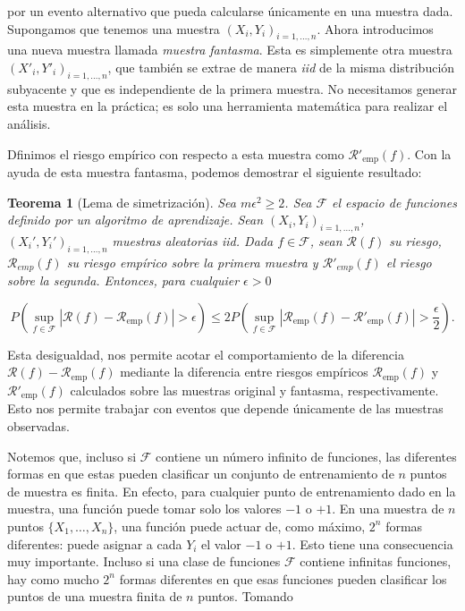\documentclass{article}
\newtheorem{thm}{Teorema}[subsection]
\begin{document}
por un evento alternativo que pueda calcularse únicamente en una muestra dada. Supongamos que tenemos una muestra 
\((X_i, Y_i)_{i=1,\dots,n}\). Ahora introducimos una nueva muestra llamada \textit{muestra fantasma}. 
Esta es simplemente otra muestra \((X'_i, Y'_i)_{i=1,\dots,n}\), que también se extrae de manera 
\textit{iid} de la misma distribución subyacente y que es independiente de la primera muestra. No necesitamos generar 
esta muestra en la práctica; es solo una herramienta matemática para realizar el análisis. \newline

Dfinimos el riesgo empírico con respecto a esta muestra como \(\mathcal{R}'_{\text{emp}}(f)\). 
Con la ayuda de esta muestra fantasma, podemos demostrar el siguiente resultado:\newline

\begin{thm}[Lema de simetrización]

Sea $m\epsilon^2 \geq 2$. Sea $\mathcal{F}$ el espacio de funciones definido por un algoritmo de aprendizaje. Sean
$(X_i,Y_i)_{i=1,\dots, n}$, $(X_i',Y_i')_{i=1,\dots, n}$ muestras aleatorias iid. Dada $f \in\mathcal{F}$,
sean $\mathcal{R}(f)$ su riesgo, $\mathcal{R}_{emp}(f)$ su riesgo empírico sobre la primera muestra y 
$\mathcal{R}'_{emp}(f)$ el riesgo sobre la segunda. Entonces, para cualquier $\epsilon > 0$

\[
P\left(\sup_{f \in \mathcal{F}} |\mathcal{R}(f) - \mathcal{R}_{\text{emp}}(f)| > 
\epsilon \right) \leq 2P\left(\sup_{f \in \mathcal{F}} |\mathcal{R}_{\text{emp}}(f) - \mathcal{R}'_{\text{emp}}(f)| > \frac{\epsilon}{2}\right).
\]\newline
\end{thm}

Esta desigualdad, nos permite acotar el comportamiento 
de la diferencia \(\mathcal{R}(f) - \mathcal{R}_{\text{emp}}(f)\) mediante la diferencia entre riesgos empíricos \(\mathcal{R}_{\text{emp}}(f)\) y 
\(\mathcal{R}'_{\text{emp}}(f)\) calculados sobre las muestras original y fantasma, respectivamente. Esto nos permite trabajar 
con eventos que depende únicamente de las muestras observadas.\newline

Notemos que, incluso si \(\mathcal{F}\) contiene un número infinito de funciones, 
las diferentes formas en que estas pueden clasificar un conjunto de entrenamiento de \(n\) puntos de muestra 
es finita. En efecto, para cualquier punto de entrenamiento dado en la muestra, una función puede tomar solo los valores 
\(-1\) o \(+1\). En una muestra de \(n\) puntos \(\{X_1, \dots, X_n\}\), una función puede actuar de, como 
máximo, \(2^n\) formas diferentes: puede asignar a cada \(Y_i\) el valor \(-1\) o \(+1\). Esto tiene una 
consecuencia muy importante. Incluso si una clase de funciones \(\mathcal{F}\) contiene infinitas funciones, hay como 
mucho \(2^n\) formas diferentes en que esas funciones pueden clasificar los puntos de una muestra finita de 
\(n\) puntos. Tomando
\end{document}
